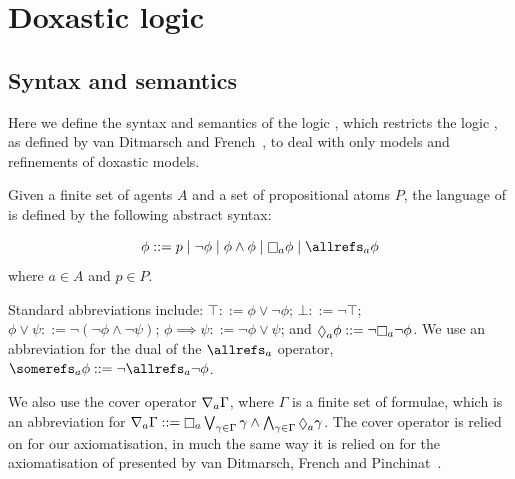 \chapter{Doxastic logic}

\section{Syntax and semantics}

Here we define the syntax and semantics of the logic \logicKDF{}, which
restricts the logic \logicKF{}, as defined by van Ditmarsch and
French~\cite{french2009simulation}, to deal with only models and refinements of
doxastic models.


\begin{definition} %
Given a finite set of agents $A$ and a set of propositional atoms $P$, the
language of \langF{} is defined by the following abstract syntax:

$$
\phi ::=    p \bnfalt
            \neg \phi \bnfalt
            \phi \land \phi \bnfalt
            \knows_a \phi \bnfalt
            \allrefs_a \phi
$$
where $a \in A$ and $p \in P$.
\end{definition}

Standard abbreviations include:
$\top ::= \phi \lor \neg \phi$;
$\bot ::= \neg \top$;
$\phi \lor \psi ::= \neg (\neg \phi \land \neg \psi)$;
$\phi \implies \psi ::= \neg \phi \lor \psi$;
and $\suspects_a \phi ::= \neg \knows_a \neg \phi$.
We use an abbreviation for the dual of the $\allrefs_a$ operator,
$\somerefs_a \phi ::= \neg \allrefs_a \neg \phi$.

We also use the cover operator $\nabla_a \Gamma$, where $\Gamma$ is a finite
set of formulae, which is an abbreviation for 
$\covers_a \Gamma ::= \knows_a \bigvee_{\gamma \in \Gamma} \gamma \land
\bigwedge_{\gamma \in \Gamma} \suspects_a \gamma$. The cover operator is relied
on for our axiomatisation, in much the same way it is relied on for the
axiomatisation of \logicKiF{} presented by van Ditmarsch, French and
Pinchinat~\cite{french2010future}. %

